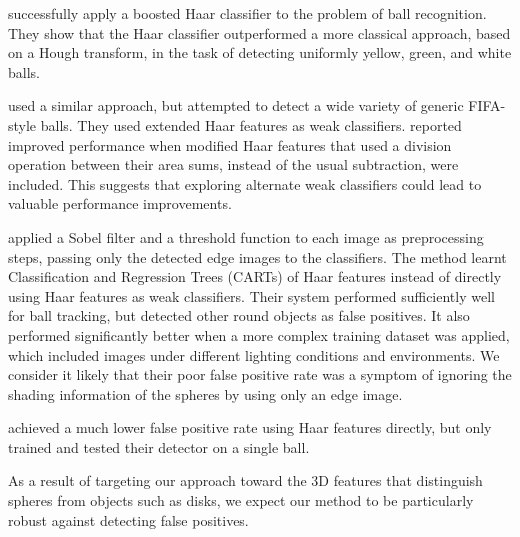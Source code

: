 \documentclass[11pt]{scrartcl}
\begin{document}
{        \citet{masselli2013haar} successfully apply a boosted Haar classifier
        \citep{viola2001robust} to the problem of ball recognition. They show
        that the Haar classifier outperformed a more classical approach, based on a
        Hough transform, in the task of detecting uniformly yellow, green, and white
        balls.

        \citet{zhang2013novel} used a similar approach, but attempted to
        detect a wide variety of generic FIFA-style balls. They used extended
        Haar features \citep{Lienhart2002extended} as weak classifiers.
        \citeauthor{zhang2013novel} reported improved performance when modified Haar
        features that used a division operation between their area sums, instead of
        the usual subtraction, were included. This suggests that exploring alternate
        weak classifiers could lead to valuable performance improvements.

        \citet{mitri2004fast} applied a Sobel filter and a threshold function
        to each image as preprocessing steps, passing only the detected edge
        images to the classifiers. The method learnt Classification and
        Regression Trees (CARTs) of Haar features instead of directly using
        Haar features as weak classifiers. Their system performed sufficiently
        well for ball tracking, but detected other round objects as false
        positives. It also performed significantly better when a more complex
        training dataset was applied, which included images under different 
        lighting conditions and environments. We consider it likely that their 
        poor false positive rate was a symptom of ignoring the shading 
        information of the spheres by using only an edge image.

        \citet{Treptow2004filter} achieved a much lower false positive rate
        using Haar features directly, but only trained and tested their
        detector on a single ball.



        As a result of targeting our approach toward the 3D features that
        distinguish spheres from objects such as disks, we expect our method
        to be particularly robust against detecting false positives.
	}
\end{document}
